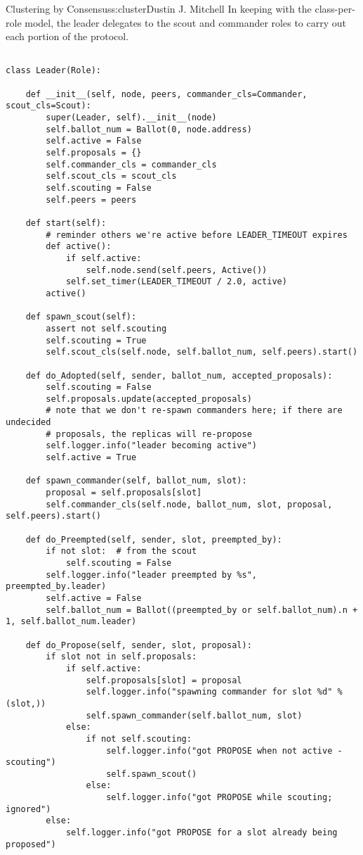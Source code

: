 \begin{aosachapter}{Clustering by Consensus}{s:cluster}{Dustin J. Mitchell}
In keeping with the class-per-role model, the leader delegates to the
scout and commander roles to carry out each portion of the protocol.

\begin{verbatim}

class Leader(Role):

    def __init__(self, node, peers, commander_cls=Commander, scout_cls=Scout):
        super(Leader, self).__init__(node)
        self.ballot_num = Ballot(0, node.address)
        self.active = False
        self.proposals = {}
        self.commander_cls = commander_cls
        self.scout_cls = scout_cls
        self.scouting = False
        self.peers = peers

    def start(self):
        # reminder others we're active before LEADER_TIMEOUT expires
        def active():
            if self.active:
                self.node.send(self.peers, Active())
            self.set_timer(LEADER_TIMEOUT / 2.0, active)
        active()

    def spawn_scout(self):
        assert not self.scouting
        self.scouting = True
        self.scout_cls(self.node, self.ballot_num, self.peers).start()

    def do_Adopted(self, sender, ballot_num, accepted_proposals):
        self.scouting = False
        self.proposals.update(accepted_proposals)
        # note that we don't re-spawn commanders here; if there are undecided
        # proposals, the replicas will re-propose
        self.logger.info("leader becoming active")
        self.active = True

    def spawn_commander(self, ballot_num, slot):
        proposal = self.proposals[slot]
        self.commander_cls(self.node, ballot_num, slot, proposal, self.peers).start()

    def do_Preempted(self, sender, slot, preempted_by):
        if not slot:  # from the scout
            self.scouting = False
        self.logger.info("leader preempted by %s", preempted_by.leader)
        self.active = False
        self.ballot_num = Ballot((preempted_by or self.ballot_num).n + 1, self.ballot_num.leader)

    def do_Propose(self, sender, slot, proposal):
        if slot not in self.proposals:
            if self.active:
                self.proposals[slot] = proposal
                self.logger.info("spawning commander for slot %d" % (slot,))
                self.spawn_commander(self.ballot_num, slot)
            else:
                if not self.scouting:
                    self.logger.info("got PROPOSE when not active - scouting")
                    self.spawn_scout()
                else:
                    self.logger.info("got PROPOSE while scouting; ignored")
        else:
            self.logger.info("got PROPOSE for a slot already being proposed")
    

\end{verbatim}
\end{aosachapter}
